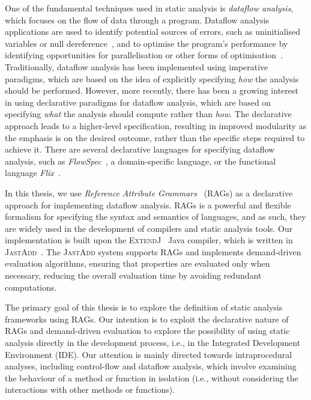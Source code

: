 One of the fundamental techniques used in static analysis is \emph{dataflow analysis},
which focuses on the flow of data through a program. Dataflow analysis applications are used to identify
potential sources of errors, such as uninitialised variables or null dereference~\cite{khedker2017data},
and to optimise the program's performance by identifying opportunities for
parallelisation or other forms of optimisation~\cite{aho2007compilers}.
Traditionally, dataflow analysis has been implemented using imperative paradigms,
which are based on the idea of explicitly specifying \emph{how} the analysis should be
performed.
However, more recently, there has been a growing interest in using
declarative paradigms for dataflow analysis, which are based on specifying \emph{what}
the analysis should compute rather than \emph{how}.
The declarative approach leads to a higher-level specification, resulting in improved modularity as
the emphasis is on the desired outcome, rather than the specific steps required to
achieve it.
There are several declarative languages for specifying dataflow analysis,
such as \emph{FlowSpec}~\cite{smits2020flowspec}, a domain-specific language,
or the functional language \emph{Flix}~\cite{madsen2016programming}.

In this thesis, we use \emph{Reference Attribute Grammars}~\cite{hedin2000rags} (RAGs)
as a declarative approach for implementing dataflow analysis. RAGs is
a powerful and flexible formalism for specifying the syntax and semantics of languages,
and as such, they are widely used in the development of compilers and static analysis tools.
Our implementation is built upon the \textsc{ExtendJ}~\cite{ekman2007jastadd} Java compiler,
which is written in \textsc{JastAdd}~\cite{DBLP:journals/entcs/HedinM01}.
The \textsc{JastAdd} system supports RAGs and implements demand-driven evaluation algorithms,
ensuring that properties are evaluated only
when necessary, reducing the overall evaluation time by avoiding redundant
computations.

The primary goal of this thesis is to explore the definition of static analysis
frameworks using RAGs.
Our intention is to exploit the declarative nature of RAGs and
demand-driven evaluation to explore the possibility of using static
analysis directly in the development process, i.e., in the Integrated Development Environment (IDE).
Our attention is mainly directed towards intraprocedural analyses,
including control-flow and dataflow analysis, which involve examining the
behaviour of a method or function in isolation (i.e., without considering the
interactions with other methods or functions).



